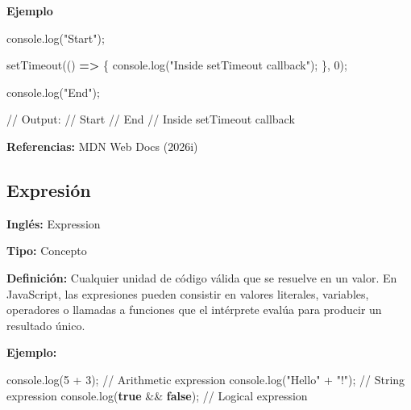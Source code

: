 \documentclass[
  letterpaper,
  DIV=11,
  numbers=noendperiod]{scrreprt}
\newenvironment{Shaded}{\begin{snugshade}}{\end{snugshade}}
\newcommand{\BuiltInTok}[1]{\textcolor[rgb]{0.00,0.23,0.31}{#1}}
\newcommand{\CommentTok}[1]{\textcolor[rgb]{0.37,0.37,0.37}{#1}}
\newcommand{\DecValTok}[1]{\textcolor[rgb]{0.68,0.00,0.00}{#1}}
\newcommand{\FunctionTok}[1]{\textcolor[rgb]{0.28,0.35,0.67}{#1}}
\newcommand{\KeywordTok}[1]{\textcolor[rgb]{0.00,0.23,0.31}{\textbf{#1}}}
\newcommand{\NormalTok}[1]{\textcolor[rgb]{0.00,0.23,0.31}{#1}}
\newcommand{\OperatorTok}[1]{\textcolor[rgb]{0.37,0.37,0.37}{#1}}
\newcommand{\PreprocessorTok}[1]{\textcolor[rgb]{0.68,0.00,0.00}{#1}}
\newcommand{\StringTok}[1]{\textcolor[rgb]{0.13,0.47,0.30}{#1}}
\let\oldsubsection\subsection
\renewcommand{\subsection}{\phantomsection\oldsubsection}
\begin{document}
\textbf{Ejemplo}

\begin{Shaded}
\begin{Highlighting}[]
\BuiltInTok{console}\OperatorTok{.}\FunctionTok{log}\NormalTok{(}\StringTok{"Start"}\NormalTok{)}\OperatorTok{;}

\PreprocessorTok{setTimeout}\NormalTok{(() }\KeywordTok{=\textgreater{}}\NormalTok{ \{}
  \BuiltInTok{console}\OperatorTok{.}\FunctionTok{log}\NormalTok{(}\StringTok{"Inside setTimeout callback"}\NormalTok{)}\OperatorTok{;}
\NormalTok{\}}\OperatorTok{,} \DecValTok{0}\NormalTok{)}\OperatorTok{;}

\BuiltInTok{console}\OperatorTok{.}\FunctionTok{log}\NormalTok{(}\StringTok{"End"}\NormalTok{)}\OperatorTok{;}

\CommentTok{// Output:}
\CommentTok{// Start}
\CommentTok{// End}
\CommentTok{// Inside setTimeout callback}
\end{Highlighting}
\end{Shaded}

\textbf{Referencias:} MDN Web Docs (2026i)

\subsection*{Expresión}\label{glos-expresion}

\textbf{Inglés:} Expression

\textbf{Tipo:} Concepto

\textbf{Definición:} Cualquier unidad de código válida que se resuelve
en un valor. En JavaScript, las expresiones pueden consistir en valores
literales, variables, operadores o llamadas a funciones que el
intérprete evalúa para producir un resultado único.

\textbf{Ejemplo:}

\begin{Shaded}
\begin{Highlighting}[]
\BuiltInTok{console}\OperatorTok{.}\FunctionTok{log}\NormalTok{(}\DecValTok{5} \OperatorTok{+} \DecValTok{3}\NormalTok{)}\OperatorTok{;}          \CommentTok{// Arithmetic expression}
\BuiltInTok{console}\OperatorTok{.}\FunctionTok{log}\NormalTok{(}\StringTok{"Hello"} \OperatorTok{+} \StringTok{"!"}\NormalTok{)}\OperatorTok{;}  \CommentTok{// String expression}
\BuiltInTok{console}\OperatorTok{.}\FunctionTok{log}\NormalTok{(}\KeywordTok{true} \OperatorTok{\&\&} \KeywordTok{false}\NormalTok{)}\OperatorTok{;}  \CommentTok{// Logical expression}
\end{Highlighting}
\end{Shaded}
\end{document}
